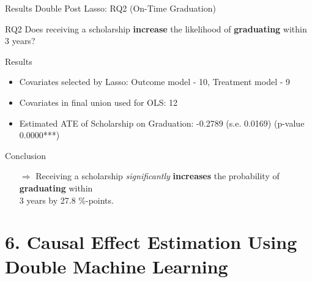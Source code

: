 \documentclass[aspectratio=169]{beamer}
\begin{document}
\begin{frame}{Results Double Post Lasso: RQ2 (On-Time Graduation)}
\hypertarget{main-slide2}{}
\vspace{20pt}
\begin{alertblock}{RQ2}
	Does receiving a scholarship \textbf{increase} the likelihood of \textbf{graduating} within 3 years?
\end{alertblock}

\begin{block}{Results}
\begin{itemize}[label=--,itemsep=1pt,topsep=2pt]
	\item Covariates selected by Lasso: Outcome model - 10, Treatment model - 9
	\item Covariates in final union used for OLS: 12
	\item Estimated ATE of Scholarship on Graduation: -0.2789 (s.e. 0.0169) (p-value 0.0000***)
\end{itemize}
\end{block}

\begin{exampleblock}{Conclusion}
\vspace{-3pt}
\begin{itemize}
	\item [$\Rightarrow$]Receiving a scholarship \textit{significantly} \textbf{increases} the probability of \textbf{graduating} within \\ 3 years by 27.8 \%-points.
\end{itemize}
\vspace{-3pt}	
\end{exampleblock}
\raggedleft
\hyperlink{appendix-slide2}{}
\end{frame}

\section{6. Causal Effect Estimation Using Double Machine Learning}
\end{document}
